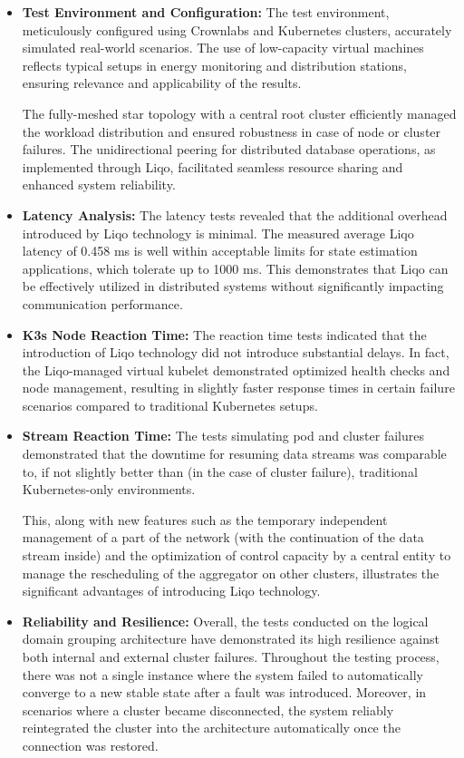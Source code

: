\begin{itemize}
\item \textbf{Test Environment and Configuration:} The test environment, meticulously configured using Crownlabs and Kubernetes clusters, accurately simulated real-world scenarios. The use of low-capacity virtual machines reflects typical setups in energy monitoring and distribution stations, ensuring relevance and applicability of the results. 

The fully-meshed star topology with a central root cluster efficiently managed the workload distribution and ensured robustness in case of node or cluster failures. The unidirectional peering for distributed database operations, as implemented through Liqo, facilitated seamless resource sharing and enhanced system reliability.

\item \textbf{Latency Analysis:} The latency tests revealed that the additional overhead introduced by Liqo technology is minimal. The measured average Liqo latency of 0.458 ms is well within acceptable limits for state estimation applications, which tolerate up to 1000 ms. This demonstrates that Liqo can be effectively utilized in distributed systems without significantly impacting communication performance.

\item \textbf{K3s Node Reaction Time:} The reaction time tests indicated that the introduction of Liqo technology did not introduce substantial delays. In fact, the Liqo-managed virtual kubelet demonstrated optimized health checks and node management, resulting in slightly faster response times in certain failure scenarios compared to traditional Kubernetes setups.

\item \textbf{Stream Reaction Time:} The tests simulating pod and cluster failures demonstrated that the downtime for resuming data streams was comparable to, if not slightly better than (in the case of cluster failure), traditional Kubernetes-only environments. 

This, along with new features such as the temporary independent management of a part of the network (with the continuation of the data stream inside) and the optimization of control capacity by a central entity to manage the rescheduling of the aggregator on other clusters, illustrates the significant advantages of introducing Liqo technology.

\item \textbf{Reliability and Resilience:} Overall, the tests conducted on the logical domain grouping architecture have demonstrated its high resilience against both internal and external cluster failures. Throughout the testing process, there was not a single instance where the system failed to automatically converge to a new stable state after a fault was introduced. Moreover, in scenarios where a cluster became disconnected, the system reliably reintegrated the cluster into the architecture automatically once the connection was restored. 


\end{itemize}
